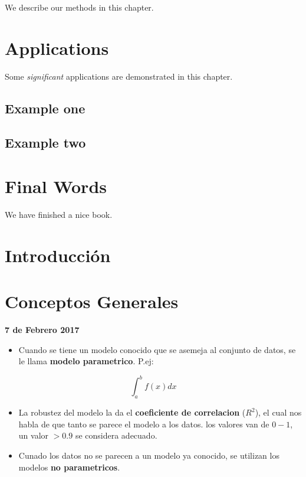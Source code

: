 \documentclass[]{book}
\providecommand{\tightlist}{%
  \setlength{\itemsep}{0pt}\setlength{\parskip}{0pt}}
\begin{document}
We describe our methods in this chapter.

\chapter{Applications}\label{applications}

Some \emph{significant} applications are demonstrated in this chapter.

\section{Example one}\label{example-one}

\section{Example two}\label{example-two}

\chapter{Final Words}\label{final-words}

We have finished a nice book.

\chapter{Introducción}\label{introduccion-1}

\chapter{Conceptos Generales}\label{conceptos-generales-1}

\textbf{7 de Febrero 2017}

\begin{itemize}
\tightlist
\item
  Cuando se tiene un modelo conocido que se asemeja al conjunto de
  datos, se le llama \textbf{modelo parametrico}. P.ej:
\end{itemize}

\[\int_{a}^{b} f(x)dx\]

\begin{itemize}
\tightlist
\item
  La robustez del modelo la da el \textbf{coeficiente de correlacion}
  (\(R^2\)), el cual nos habla de que tanto se parece el modelo a los
  datos. los valores van de \(0-1\), un valor \(>0.9\) se considera
  adecuado.
\item
  Cunado los datos no se parecen a un modelo ya conocido, se utilizan
  los modelos \textbf{no parametricos}.
\end{itemize}
\end{document}
